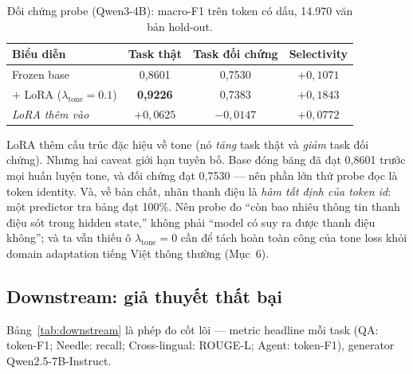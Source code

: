 \documentclass[runningheads]{llncs}
\begin{document}
\begin{table}[H]
\centering
\caption{Đối chứng probe (Qwen3-4B): macro-F1 trên token có dấu, 14.970 văn bản hold-out.}
\label{tab:probe}
\begin{tabular}{lccc}
\toprule
\textbf{Biểu diễn} & \textbf{Task thật} & \textbf{Task đối chứng} & \textbf{Selectivity} \\
\midrule
Frozen base & 0,8601 & 0,7530 & $+0{,}1071$ \\
$+$ LoRA ($\lambda_{\text{tone}}{=}0.1$) & \textbf{0,9226} & 0,7383 & \textbf{$+0{,}1843$} \\
\textit{LoRA thêm vào} & \textbf{$+0{,}0625$} & \textbf{$-0{,}0147$} & $+0{,}0772$ \\
\bottomrule
\end{tabular}
\end{table}

LoRA thêm cấu trúc đặc hiệu về tone (nó \emph{tăng} task thật và \emph{giảm} task đối chứng). Nhưng hai caveat giới hạn tuyên bố. Base đóng băng đã đạt 0,8601 trước mọi huấn luyện tone, và đối chứng đạt 0,7530 --- nên phần lớn thứ probe đọc là token identity. Và, về bản chất, nhãn thanh điệu là \emph{hàm tất định của token id}: một predictor tra bảng đạt 100\%. Nên probe đo ``còn bao nhiêu thông tin thanh điệu sót trong hidden state,'' không phải ``model có suy ra được thanh điệu không''; và ta vẫn thiếu ô $\lambda_{\text{tone}}{=}0$ cần để tách hoàn toàn công của tone loss khỏi domain adaptation tiếng Việt thông thường (Mục~6).

\subsection{Downstream: giả thuyết thất bại}

Bảng~\ref{tab:downstream} là phép đo cốt lõi --- metric headline mỗi task (QA: token-F1; Needle: recall; Cross-lingual: ROUGE-L; Agent: token-F1), generator Qwen2.5-7B-Instruct.
\end{document}
